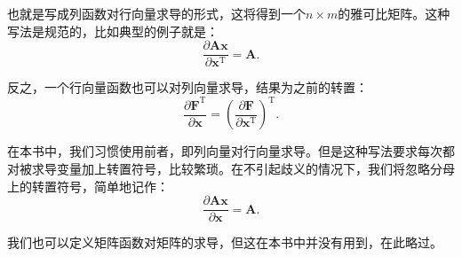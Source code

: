 也就是写成列函数对行向量求导的形式，这将得到一个$n \times m$的雅可比矩阵。这种写法是规范的，比如典型的例子就是：
\begin{equation}
\frac{\partial \bm{Ax}} {\partial\bm{x}^\mathrm{T}} = \bm{A}.
\end{equation}

反之，一个行向量函数也可以对列向量求导，结果为之前的转置：
\begin{equation}
\frac{{\partial \bm{F}}^\mathrm{T}}{{\partial {\bm{x}}}}  = \left(\frac{{\partial \bm{F}}}{{\partial {\bm{x}^\mathrm{T}}}} \right)^ \mathrm{T}.
\end{equation}

在本书中，我们习惯使用前者，即列向量对行向量求导。但是这种写法要求每次都对被求导变量加上转置符号，比较繁琐。在不引起歧义的情况下，我们将忽略分母上的转置符号，简单地记作：
\begin{equation}
\frac{\partial \bm{Ax}} {\partial\bm{x}} = \bm{A}.
\end{equation}

我们也可以定义矩阵函数对矩阵的求导，但这在本书中并没有用到，在此略过。
